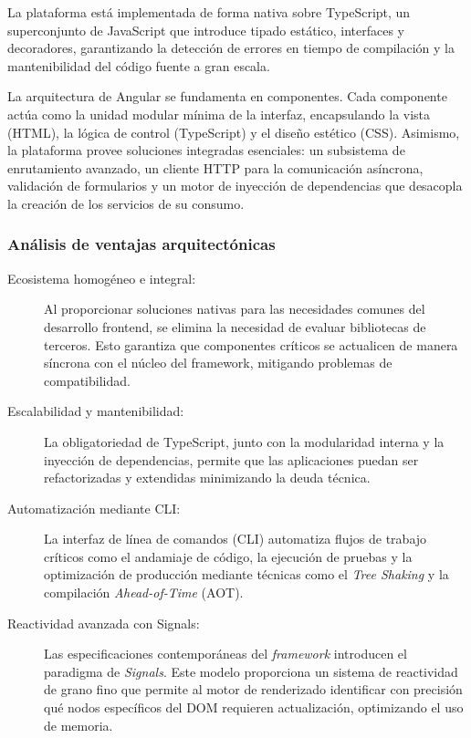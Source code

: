 La plataforma está implementada de forma nativa sobre TypeScript, un superconjunto de JavaScript que introduce tipado estático, interfaces y decoradores, garantizando la detección de errores en tiempo de compilación y la mantenibilidad del código fuente a gran escala.

La arquitectura de Angular se fundamenta en componentes. Cada componente actúa como la unidad modular mínima de la interfaz, encapsulando la vista (HTML), la lógica de control (TypeScript) y el diseño estético (CSS). Asimismo, la plataforma provee soluciones integradas esenciales: un subsistema de enrutamiento avanzado, un cliente HTTP para la comunicación asíncrona, validación de formularios y un motor de inyección de dependencias que desacopla la creación de los servicios de su consumo.

\subsubsection{Análisis de ventajas arquitectónicas}
\begin{description}
    \item[Ecosistema homogéneo e integral:] Al proporcionar soluciones nativas para las necesidades comunes del desarrollo frontend, se elimina la necesidad de evaluar bibliotecas de terceros. Esto garantiza que componentes críticos se actualicen de manera síncrona con el núcleo del framework, mitigando problemas de compatibilidad.
    \item[Escalabilidad y mantenibilidad:] La obligatoriedad de TypeScript, junto con la modularidad interna y la inyección de dependencias, permite que las aplicaciones puedan ser refactorizadas y extendidas minimizando la deuda técnica.
    \item[Automatización mediante CLI:] La interfaz de línea de comandos (CLI) automatiza flujos de trabajo críticos como el andamiaje de código, la ejecución de pruebas y la optimización de producción mediante técnicas como el \textit{Tree Shaking} y la compilación \textit{Ahead-of-Time} (AOT).
    \item[Reactividad avanzada con Signals:] Las especificaciones contemporáneas del \textit{framework} introducen el paradigma de \textit{Signals}. Este modelo proporciona un sistema de reactividad de grano fino que permite al motor de renderizado identificar con precisión qué nodos específicos del DOM requieren actualización, optimizando el uso de memoria.
\end{description}

